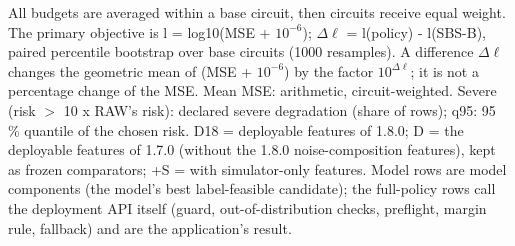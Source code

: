 \begin{table}[p]
\begin{tabular}{lrrrrr}
\bottomrule
\end{tabular}
\par\vspace{0.5em}
\begin{minipage}{0.97\linewidth}
\footnotesize All budgets are averaged within a base circuit, then circuits receive equal weight. The primary objective is l = log10(MSE + $10^{-6}$); $\Delta\ell$ = l(policy) - l(SBS-B), paired percentile bootstrap over base circuits (1000 resamples). A difference $\Delta\ell$ changes the geometric mean of (MSE + $10^{-6}$) by the factor $10^{\Delta\ell}$; it is not a percentage change of the MSE. Mean MSE: arithmetic, circuit-weighted. Severe (risk $>$ 10 x RAW's risk): declared severe degradation (share of rows); q95: 95 \% quantile of the chosen risk. D18 = deployable features of 1.8.0; D = the deployable features of 1.7.0 (without the 1.8.0 noise-composition features), kept as frozen comparators; +S = with simulator-only features. Model rows are model components (the model's best label-feasible candidate); the full-policy rows call the deployment API itself (guard, out-of-distribution checks, preflight, margin rule, fallback) and are the application's result.
\end{minipage}
\end{table}
